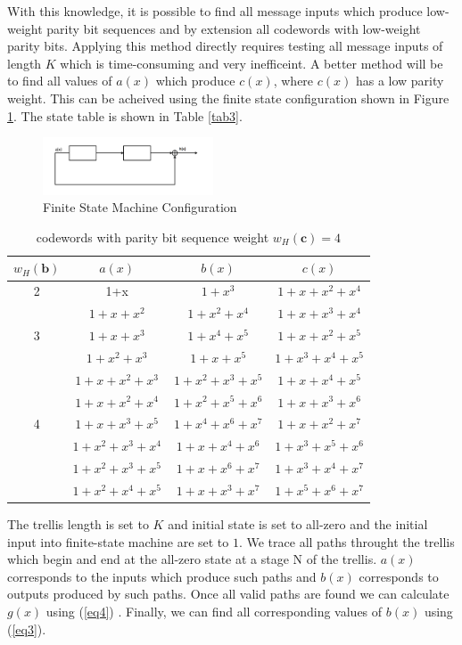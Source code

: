 \documentclass[fontsize=12pt]{article}
\begin{document}
 With this knowledge, it is possible to find all message inputs which produce low-weight parity bit sequences and by extension all codewords  with low-weight parity bits. Applying this method directly requires testing all message inputs of length $K$ which is time-consuming and very inefficeint. A better method will be to find all values of $a(x)$ which produce $c(x)$, where $c(x)$ has a low parity weight. This can be acheived using the finite state configuration shown in Figure \ref{fig2}. The state table is shown in Table \ref{tab3}. 
 
\begin{figure}[h]
\centering
		\includegraphics[width=0.45\textwidth]{fsm.png}
		\caption{Finite State Machine Configuration}
		\label{fig2}
		\end{figure}
		
		
		\begin{table}[h!]
 
 \caption{codewords with parity bit sequence weight $w_H(\textbf{c})=4$}
\centering
 \begin{tabular}{c c c c} 
 \hline
 $w_H(\textbf{b})$ & $a(x)$ & $b(x)$ & $c(x)$ \\ [0.5ex] 
 \hline\hline
 2 & 1+x & $1+x^3$ & $1+x+x^2+x^4$\\ 
 \hline 
  & $1+x+x^2$& $1+x^2+x^4$& $1+x+x^3+x^4$ \\
   3 & $1+x+x^3$& $1+x^4+x^5$ & $1+x+x^2+x^5$ \\
  & $1+x^2+x^3$ & $1+x+x^5$ & $1+x^3+x^4+x^5$ \\
  \hline 
  & $1+x+x^2+x^3 $ & $1+x^2+x^3+x^5$ & $1+x+x^4+x^5$ \\
  & $1+x+x^2+x^4 $ & $1+x^2+x^5+x^6$ & $1+x+x^3+x^6$ \\
 4 & $1+x+x^3+x^5 $ & $1+x^4+x^6+x^7$ & $1+x+x^2+x^7$\\ 
  & $1+x^2+x^3+x^4 $ & $1+x+x^4+x^6$ & $1+x^{3}+x^5+x^6$ \\ 
  & $1+x^2+x^3+x^5 $ & $1+x+x^6+x^7$ & $1+x^{3}+x^4+x^7$ \\  
  & $1+x^2+x^4+x^5 $ & $1+x+x^3+x^7$ & $1+x^5+x^6+x^7$ \\ 
 [1ex]
 \hline
 \end{tabular}
 \label{tab2}
\end{table}
		The trellis length is set to $K$ and initial state is set to all-zero and the initial input into finite-state machine are set to $1$.  We trace all paths throught the trellis which begin and end at the all-zero state at a stage N of the trellis. $a(x)$ corresponds to the inputs which produce such paths and $b(x)$ corresponds to outputs produced by such paths. Once all valid paths are found we can calculate $g(x)$ using (\ref{eq4}) . Finally, we can find all corresponding values of $b(x)$ using (\ref{eq3}).
 
\end{document}
